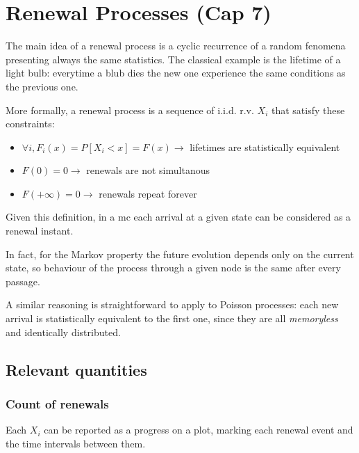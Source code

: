 \chapter{Renewal Processes (Cap 7)}
The main idea of a renewal process is a cyclic recurrence of a random fenomena presenting always the same statistics.
The classical example is the lifetime of a light bulb: everytime a blub dies the new one experience the same conditions as the previous one.

\begin{definition}
	More formally, a renewal process is a sequence of i.i.d. r.v. $X_i$ that satisfy these constraints:

	\begin{itemize}
		\item $ \forall i, F_i(x) = P[X_i < x] = F(x) \rightarrow $ lifetimes are statistically equivalent
		\item $ F(0) = 0 \rightarrow $ renewals are not simultanous
		\item $ F(+\infty) = 0 \rightarrow $ renewals repeat forever
	\end{itemize}
\end{definition}

\begin{remark}
	Given this definition, in a \gls{mc} each arrival at a given state can be considered as a renewal instant.

	In fact, for the Markov property the future evolution depends only on the current state, so behaviour of the process through a given node is the same after every passage.
\end{remark}

\begin{remark}
	A similar reasoning is straightforward to apply to Poisson processes: each new arrival is statistically equivalent to the first one, since they are all \emph{memoryless} and identically distributed.
\end{remark}

\section{Relevant quantities}

\subsection{Count of renewals}
	Each $X_i$ can be reported as a progress on a plot, marking each renewal event and the time intervals between them.

